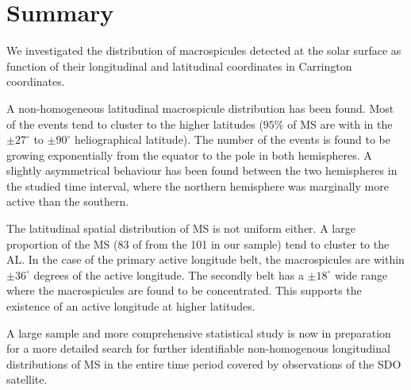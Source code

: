 \section{Summary}
We investigated the distribution of macrospicules detected at the solar surface as function of their longitudinal and latitudinal coordinates in Carrington coordinates.

A non-homogeneous latitudinal macrospicule distribution has been found. Most of the events tend to cluster to the higher latitudes ($95\%$ of MS are with in the $\pm27^{\circ}$ to $\pm90^{\circ}$ heliographical latitude). The number of the events is found to be growing exponentially from the equator to the pole in both hemispheres. A slightly asymmetrical behaviour has been found between the two hemispheres in the studied time interval, where the northern hemisphere was marginally more active than the southern. 

The latitudinal spatial distribution of MS is not uniform either. A large proportion of the MS (83 of from the 101 in our sample) tend to cluster to the AL. In the case of the primary active longitude belt, the macrospicules are within $\pm 36^{\circ}$ degrees of the active longitude. The secondly belt has a $\pm 18^{\circ}$ wide range where the macrospicules are found to be concentrated. This supports the existence of an active longitude at higher latitudes.

A large sample and more comprehensive statistical study is now in preparation for a more detailed search for further identifiable non-homogenous longitudinal distributions of MS in the entire time period covered by observations of the SDO satellite.
